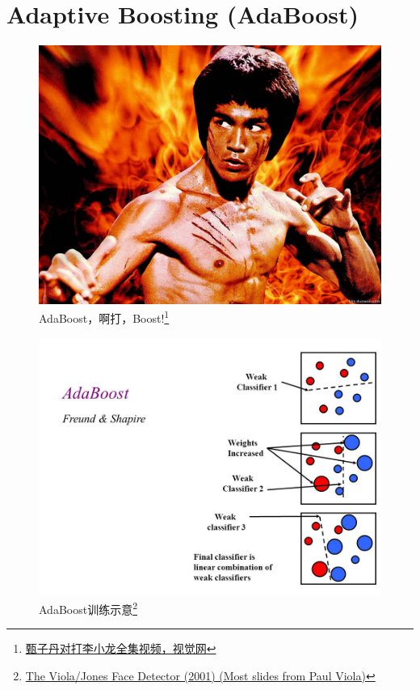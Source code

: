 
\section{Adaptive Boosting (AdaBoost)}
\begin{frame}
    \begin{figure}[!tb]
        \includegraphics[width=\onepicwidth]{figure/adaboost/ada}
        \caption{AdaBoost，啊打，Boost!\footnote{
                 \href{http://cectv.net/v-XNzA4MjQyNDky.html}{甄子丹对打李小龙全集视频，视觉网}}}
    \end{figure}
\end{frame}

\begin{frame}
    \begin{figure}[!tb]
        \includegraphics[width=\onepicwidth]{figure/adaboost/adaboost}
        \caption{AdaBoost训练示意\footnote{
                 \href{http://slideplayer.com/slide/4816467/}{The Viola/Jones Face Detector (2001) (Most slides from Paul Viola)}}}
    \end{figure}
\end{frame}
